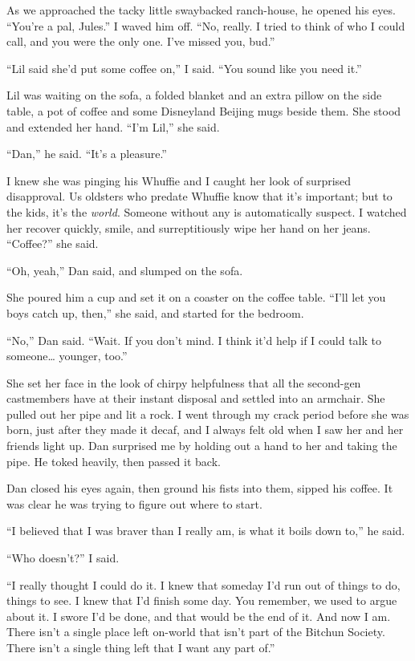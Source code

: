 As we approached the tacky little swaybacked ranch-house, he opened
his eyes. “You're a pal, Jules.” I waved him off. “No, really. I
tried to think of who I could call, and you were the only one. I've
missed you, bud.”

“Lil said she'd put some coffee on,” I said. “You sound like you
need it.”

Lil was waiting on the sofa, a folded blanket and an extra pillow
on the side table, a pot of coffee and some Disneyland Beijing mugs
beside them. She stood and extended her hand. “I'm Lil,” she said.

“Dan,” he said. “It's a pleasure.”

I knew she was pinging his Whuffie and I caught her look of
surprised disapproval. Us oldsters who predate Whuffie know that
it's important; but to the kids, it's the \emph{world}. Someone
without any is automatically suspect. I watched her recover
quickly, smile, and surreptitiously wipe her hand on her jeans.
“Coffee?” she said.

“Oh, yeah,” Dan said, and slumped on the sofa.

She poured him a cup and set it on a coaster on the coffee table.
“I'll let you boys catch up, then,” she said, and started for the
bedroom.

“No,” Dan said. “Wait. If you don't mind. I think it'd help if I
could talk to someone… younger, too.”

She set her face in the look of chirpy helpfulness that all the
second-gen castmembers have at their instant disposal and settled
into an armchair. She pulled out her pipe and lit a rock. I went
through my crack period before she was born, just after they made
it decaf, and I always felt old when I saw her and her friends
light up. Dan surprised me by holding out a hand to her and taking
the pipe. He toked heavily, then passed it back.

Dan closed his eyes again, then ground his fists into them, sipped
his coffee. It was clear he was trying to figure out where to
start.

“I believed that I was braver than I really am, is what it boils
down to,” he said.

“Who doesn't?” I said.

“I really thought I could do it. I knew that someday I'd run out of
things to do, things to see. I knew that I'd finish some day. You
remember, we used to argue about it. I swore I'd be done, and that
would be the end of it. And now I am. There isn't a single place
left on-world that isn't part of the Bitchun Society. There isn't a
single thing left that I want any part of.”

